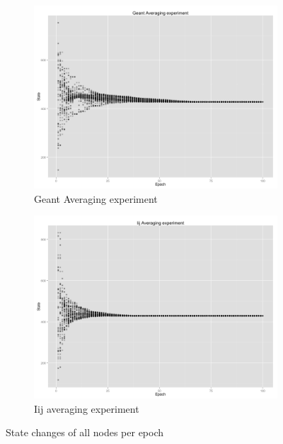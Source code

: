 \begin{figure}[h!]
    \begin{subfigure}[t]{0.47\textwidth}
    \vspace{0pt}
    \includegraphics[width=\linewidth]{figures/Geant.png}
    \caption{Geant Averaging experiment}
    \end{subfigure}
    \begin{subfigure}[t]{0.47\textwidth}
    \vspace{0pt}
    \includegraphics[width=\linewidth]{figures/Iij.png}
    \caption{Iij averaging experiment}
    \end{subfigure}
    \caption{State changes of all nodes per epoch}
    \label{fig:result}

\end{figure}
